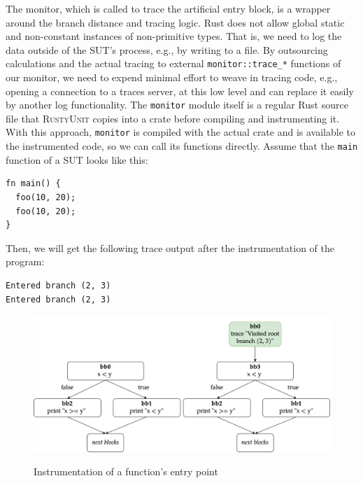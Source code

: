 \documentclass[paper=a4,%
  twoside,%
  BCOR4mm,%
  abstract=true,%
  toc=bibliography,%
  chapterprefix=true,%
  toc=bibliographynumbered,%
  open=right,%
  english,%
  pagesize=pdftex]{scrreprt}
\newcommand{\tech}{\textsc{RustyUnit}\xspace}
\newcommand{\sut}{\ac{SUT}\xspace}
\begin{document}
The monitor, which is called to trace the artificial entry block, is a wrapper around the branch distance and tracing logic. Rust does not allow global static and non-constant instances of non-primitive types. That is, we need to log the data outside of the \sut's process, e.g., by writing to a file. By outsourcing calculations and the actual tracing to external \texttt{monitor::trace\string_*} functions of our monitor, we need to expend minimal effort to weave in tracing code, e.g., opening a connection to a traces server, at this low level and can replace it easily by another log functionality. The \texttt{monitor} module itself is a regular Rust source file that \tech copies into a crate before compiling and instrumenting it. With this approach, \texttt{monitor} is compiled with the actual crate and is available to the instrumented code, so we can call its functions directly. Assume that the \texttt{main} function of a \sut looks like this:
\begin{lstlisting}[style=boxed, caption={}]
fn main() {
  foo(10, 20);
  foo(10, 20);
}
\end{lstlisting}

Then, we will get the following trace output after the instrumentation of the program:

\begin{lstlisting}[language={}, style=boxed, caption={}]
Entered branch (2, 3)
Entered branch (2, 3)
\end{lstlisting}

\begin{figure}[h]
\caption{Instrumentation of a function's entry point}
\centering
\includegraphics[width=\textwidth]{comparison-instrumented-fn-entry}
\label{fig:comparison-instrumented-fn-entry}
\end{figure}
\end{document}
